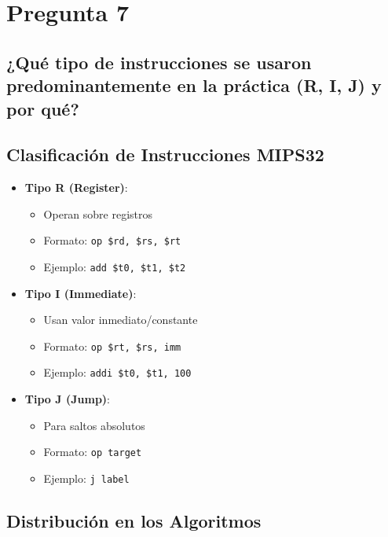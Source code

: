 \documentclass{article}
\begin{document}

\section*{Pregunta 7}

\subsection*{¿Qué tipo de instrucciones se usaron predominantemente en la práctica (R, I, J) y por 
qué? }

\subsection*{Clasificación de Instrucciones MIPS32}

\begin{itemize}
    \item \textbf{Tipo R (Register)}:
    \begin{itemize}
        \item Operan sobre registros
        \item Formato: \texttt{op \$rd, \$rs, \$rt}
        \item Ejemplo: \texttt{add \$t0, \$t1, \$t2}
    \end{itemize}
    
    \item \textbf{Tipo I (Immediate)}:
    \begin{itemize}
        \item Usan valor inmediato/constante
        \item Formato: \texttt{op \$rt, \$rs, imm}
        \item Ejemplo: \texttt{addi \$t0, \$t1, 100}
    \end{itemize}
    
    \item \textbf{Tipo J (Jump)}:
    \begin{itemize}
        \item Para saltos absolutos
        \item Formato: \texttt{op target}
        \item Ejemplo: \texttt{j label}
    \end{itemize}
\end{itemize}

\subsection*{Distribución en los Algoritmos}
\end{document}
